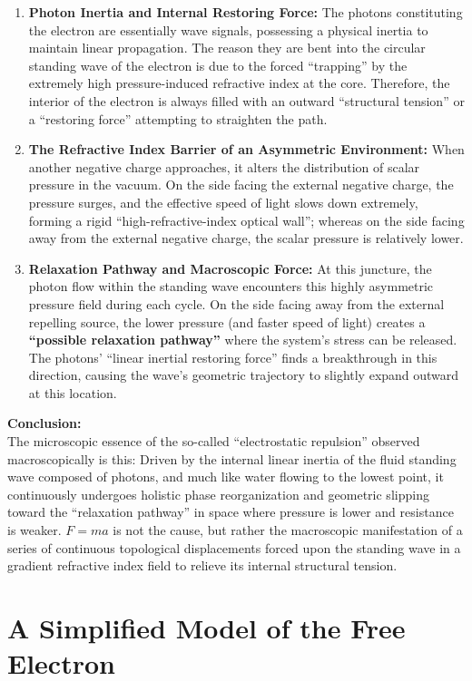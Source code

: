 \documentclass[12pt, a4paper]{article}
\begin{document}
\begin{enumerate}
    \item \textbf{Photon Inertia and Internal Restoring Force:} The photons constituting the electron are essentially wave signals, possessing a physical inertia to maintain linear propagation. The reason they are bent into the circular standing wave of the electron is due to the forced ``trapping'' by the extremely high pressure-induced refractive index at the core. Therefore, the interior of the electron is always filled with an outward ``structural tension'' or a ``restoring force'' attempting to straighten the path.
    \item \textbf{The Refractive Index Barrier of an Asymmetric Environment:} When another negative charge approaches, it alters the distribution of scalar pressure in the vacuum. On the side facing the external negative charge, the pressure surges, and the effective speed of light slows down extremely, forming a rigid ``high-refractive-index optical wall''; whereas on the side facing away from the external negative charge, the scalar pressure is relatively lower.
    \item \textbf{Relaxation Pathway and Macroscopic Force:} At this juncture, the photon flow within the standing wave encounters this highly asymmetric pressure field during each cycle. On the side facing away from the external repelling source, the lower pressure (and faster speed of light) creates a \textbf{``possible relaxation pathway''} where the system's stress can be released. The photons' ``linear inertial restoring force'' finds a breakthrough in this direction, causing the wave's geometric trajectory to slightly expand outward at this location.
\end{enumerate}

\textbf{Conclusion:}\\
The microscopic essence of the so-called ``electrostatic repulsion'' observed macroscopically is this: Driven by the internal linear inertia of the fluid standing wave composed of photons, and much like water flowing to the lowest point, it continuously undergoes holistic phase reorganization and geometric slipping toward the ``relaxation pathway'' in space where pressure is lower and resistance is weaker. $F=ma$ is not the cause, but rather the macroscopic manifestation of a series of continuous topological displacements forced upon the standing wave in a gradient refractive index field to relieve its internal structural tension.


\section{A Simplified Model of the Free Electron}
\end{document}
